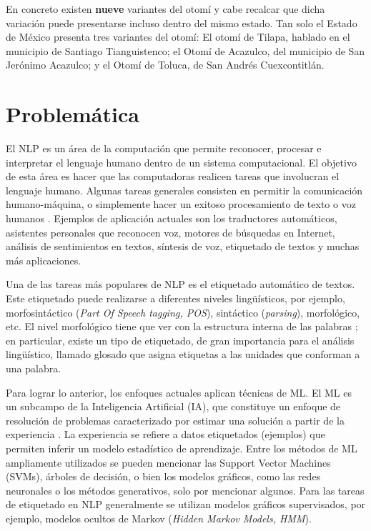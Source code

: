 \documentclass[letterpaper,12pt,oneside]{book}
\theoremstyle{definition}
\begin{document}
En concreto existen \textbf{nueve} variantes del otomí y cabe recalcar que dicha variación puede presentarse incluso dentro del mismo estado. Tan solo el Estado de México presenta tres variantes del otomí: El otomí de Tilapa, hablado en el municipio de Santiago Tianguistenco; el Otomí de Acazulco, del municipio de San Jerónimo Acazulco; y el Otomí de Toluca, de San Andrés Cuexcontitlán.

\section{Problemática}

El NLP es un área de la computación que permite reconocer, procesar e interpretar el lenguaje humano dentro de un sistema computacional. El objetivo de esta área es hacer que las computadoras realicen tareas que involucran el lenguaje humano. Algunas tareas generales consisten en permitir la comunicación humano-máquina, o simplemente hacer un exitoso procesamiento de texto o voz humanos \citep{jurafsky2008speech}. Ejemplos de aplicación actuales son los traductores automáticos, asistentes personales que reconocen voz, motores de búsquedas en Internet, análisis de sentimientos en textos,  síntesis de voz, etiquetado de textos y muchas más aplicaciones.

Una de las tareas más populares de NLP es el etiquetado automático de textos. Este etiquetado puede realizarse a diferentes niveles lingüísticos, por ejemplo, morfosintáctico (\textit{Part Of Speech tagging, POS}), sintáctico (\textit{parsing}), morfológico, etc.  El nivel morfológico tiene que ver con la estructura interna de las palabras \citep{haspelmath2013understanding}; en particular, existe un tipo de etiquetado, de gran importancia para el análisis lingüístico, llamado glosado que asigna etiquetas a las unidades que conforman a una palabra. 

Para lograr lo anterior, los enfoques actuales aplican técnicas de ML. El ML es un subcampo de la Inteligencia Artificial (IA), que constituye un enfoque de resolución de problemas caracterizado por estimar una solución a partir de la experiencia \citep{mitchell1997machine}.  La experiencia se refiere a datos etiquetados (ejemplos) que permiten inferir un modelo estadístico de aprendizaje. Entre los métodos de ML ampliamente utilizados se pueden mencionar las Support Vector Machines (SVMs), árboles de decisión, o bien los modelos gráficos, como las redes neuronales o los métodos generativos, solo por mencionar algunos. Para las tareas de etiquetado en NLP generalmente se utilizan modelos gráficos supervisados, por ejemplo, modelos ocultos de Markov (\textit{Hidden Markov Models, HMM}).
\end{document}
